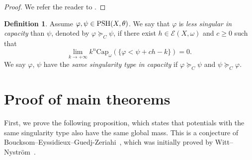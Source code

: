 \documentclass[a4paper]{amsart}
\numberwithin{equation}{section}
\theoremstyle{definition}
\newtheorem{definition}[theorem]{Definition}
\numberwithin{equation}{section}
\newcommand{\capK}{\text{Cap}}
\newcommand{\PSH}{{\rm PSH}}
\begin{document}
\begin{proof}
	We refer the reader to \cite[Proposition 2.4]{dang2023continuity}. 
\end{proof}
\begin{definition}\label{def: sing-capa}
Assume $\varphi,\psi\in\PSH(X,\theta)$. We say that $\varphi$ is {\em less singular in capacity} than $\psi$, denoted by $\varphi\succeq_C \psi$, if there exist $h\in\mathcal{E}(X,\omega)$ and $c\geq 0$ such that
\begin{equation}\label{eq: def-sing-capa} \lim_{k\to+\infty}k^n\capK_{\omega}(\{\varphi<\psi+ch-k\})=0.\end{equation}
We say $\varphi$, $\psi$ have the {\em same singularity
type in capacity} if $\varphi\succeq_C \psi$ and $\psi\succeq_C \varphi$.
\end{definition}
 
\section{Proof of main theorems}

First, we prove the following proposition, which states that potentials with the same singularity type also have the same global mass. 
This is a conjecture of Boucksom--Eyssidieux--Guedj-Zeriahi~\cite[page 217]{boucksom2010monge}, which was initially proved by Witt--Nystr\"om~\cite{wittnystrom19-monotonicity}.
\end{document}
